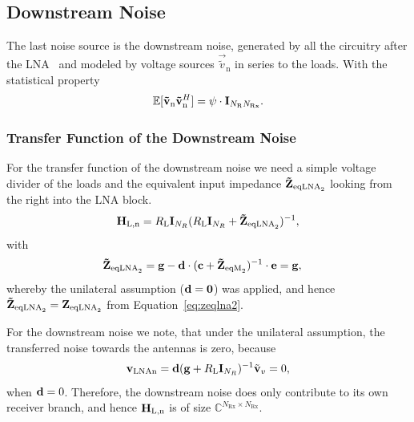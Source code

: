 \subsection{Downstream Noise}
\label{sec:down_noise}
The last noise source is the downstream noise, generated by all the circuitry after the LNA~\cite{Hughes2012} and modeled by voltage sources $\vec{\tilde{v}}_\text{n}$ in series to the loads.
With the statistical property
\begin{equation}
\label{eq:cov_down}
\mathbb{E}[\mathbf{\tilde{v}}_\text{n}\mathbf{\tilde{v}}_\text{n}^H] = \psi\cdot\mathbf{I}_{N_\text{R}N_\text{Rx}}.
\end{equation}

\subsubsection{Transfer Function of the Downstream Noise}
\label{sec:down_noise_transf}
For the transfer function of the downstream noise we need a simple voltage divider of the loads and the equivalent input impedance $\mathbf{\tilde{Z}}_{\text{eqLNA}_2}$ looking from the right into the LNA block.
\begin{equation}
\mathbf{H}_\text{L,n} = R_\text{L}\mathbf{I}_{N_R}(R_\text{L}\mathbf{I}_{N_R} + \mathbf{\tilde{Z}}_{\text{eqLNA}_2})^{-1},
\end{equation}
with 
\begin{align}
\label{eq:zeqlna2_down}
\mathbf{\tilde{Z}}_{\text{eqLNA}_2} &= \mathbf{g} - \mathbf{d}\cdot(\mathbf{c} + \mathbf{\tilde{Z}}_{\text{eqM}_2})^{-1}\cdot\mathbf{e} = \mathbf{g},
\end{align}
whereby the unilateral assumption ($\mathbf{d}=\mathbf{0}$) was applied, and hence $\mathbf{\tilde{Z}}_{\text{eqLNA}_2}=\mathbf{Z}_{\text{eqLNA}_2}$ from Equation~\eqref{eq:zeqlna2}.

For the downstream noise we note, that under the unilateral assumption, the transferred noise towards the antennas is zero, because
\begin{align}
\mathbf{v}_\text{LNAn} = \mathbf{d}(\mathbf{g}+R_\text{L}\mathbf{I}_{N_R})^{-1} \tilde{\mathbf{v}}_{v}=0,
\end{align}
when $\mathbf{d}=0$.
Therefore, the downstream noise does only contribute to its own receiver branch, and hence $\mathbf{H}_\text{L,n}$ is of size $\mathbb{C}^{N_\text{Rx}\times N_\text{Rx}}$.

